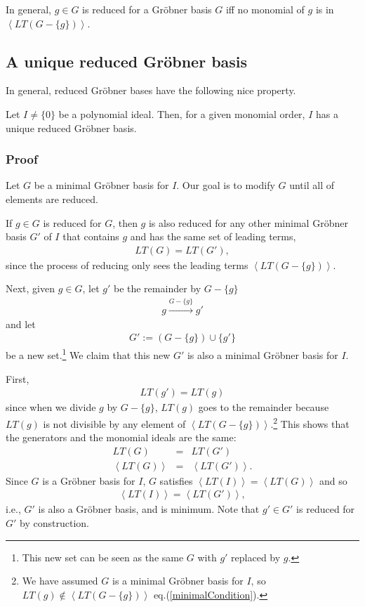 \documentclass[11pt]{book}
\begin{document}
In general, $g \in G$ is reduced for a Gr\"obner basis $G$ iff no monomial of $g$ is in $\left< LT(G - \{g\}) \right>$.

\subsection{A unique reduced Gr\"obner basis}
\label{theUniquenessOfReducedGB}
In general, reduced Gr\"obner bases have the following nice property.

Let $I \neq \{0 \}$ be a polynomial ideal.
Then, for a given monomial order, $I$ has a unique reduced Gr\"obner basis.

\subsubsection{Proof}
Let $G$ be a minimal Gr\"obner basis for $I$.
Our goal is to modify $G$ until all of elements are reduced.

If $g \in G$ is reduced for $G$, then $g$ is also reduced for any other minimal Gr\"obner basis $G'$ of $I$ that contains $g$ and has the same set of leading terms, 
\begin{eqnarray}
LT(G) = LT(G'),
\end{eqnarray}
since the process of reducing only sees the leading terms $\left< LT(G - \{g\}) \right>$.

Next, given $g \in G$, let $g'$ be the remainder by $G - \{g\}$
\begin{eqnarray}
g \stackrel{G - \{g\}}{\to} g'
\end{eqnarray}
and let
\begin{eqnarray}
G' := (G-\{g\}) \cup \{g'\}
\end{eqnarray}
be a new set.\footnote{This new set can be seen as the same $G$ with $g'$ replaced by $g$.}
We claim that this new $G'$ is also a minimal Gr\"obner basis for $I$.

First,
\begin{eqnarray}
LT(g') = LT(g)
\end{eqnarray}
since when we divide $g$ by $G-\{g\}$, $LT(g)$ goes to the remainder because $LT(g)$ is not divisible by any element of $\left< LT(G - \{g\}) \right>$.\footnote{We have assumed $G$ is a minimal Gr\"obner basis for $I$, so $LT(g) \notin \left< LT(G - \{g\}) \right> $ eq.(\ref{minimalCondition}).}
This shows that the generators and the monomial ideals are the same:
\begin{eqnarray}
LT(G) &=& LT(G') \\
\left< LT(G) \right> &=& \left< LT(G') \right>.
\end{eqnarray}
Since $G$ is a Gr\"obner basis for $I$, $G$ satisfies $\left<LT(I)\right> = \left<LT(G) \right>$ and so
\begin{eqnarray}
\left<LT(I)\right> = \left<LT(G') \right>,
\end{eqnarray}
i.e., $G'$ is also a Gr\"obner basis, and is minimum.
Note that $g' \in G'$ is reduced for $G'$ by construction.
 
\end{document}
